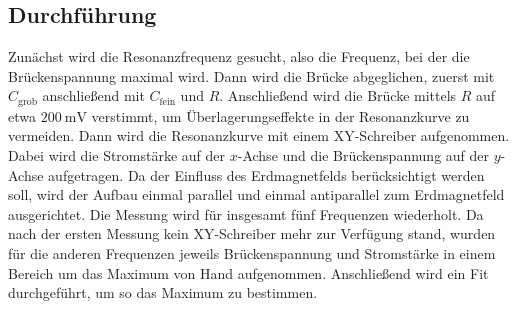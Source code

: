 \subsection{Durchführung}
Zunächst wird die Resonanzfrequenz gesucht, also die Frequenz, bei der die Brückenspannung maximal wird. Dann wird die Brücke abgeglichen, zuerst mit $C_\mathrm{grob}$ anschließend mit $C_\mathrm{fein}$ und $R$. Anschließend wird die Brücke mittels $R$ auf etwa $\SI{200}{\milli\volt}$ verstimmt, um Überlagerungseffekte in der Resonanzkurve zu vermeiden. Dann wird die Resonanzkurve mit einem XY-Schreiber aufgenommen. Dabei wird die Stromstärke auf der $x$-Achse und die Brückenspannung auf der $y$-Achse aufgetragen. Da der Einfluss des Erdmagnetfelds berücksichtigt werden soll, wird der Aufbau einmal parallel und einmal antiparallel zum Erdmagnetfeld ausgerichtet. Die Messung wird für insgesamt fünf Frequenzen wiederholt. Da nach der ersten Messung kein XY-Schreiber mehr zur Verfügung stand, wurden für die anderen Frequenzen jeweils Brückenspannung und Stromstärke in einem Bereich um das Maximum von Hand aufgenommen. Anschließend wird ein Fit durchgeführt, um so das Maximum zu bestimmen.
